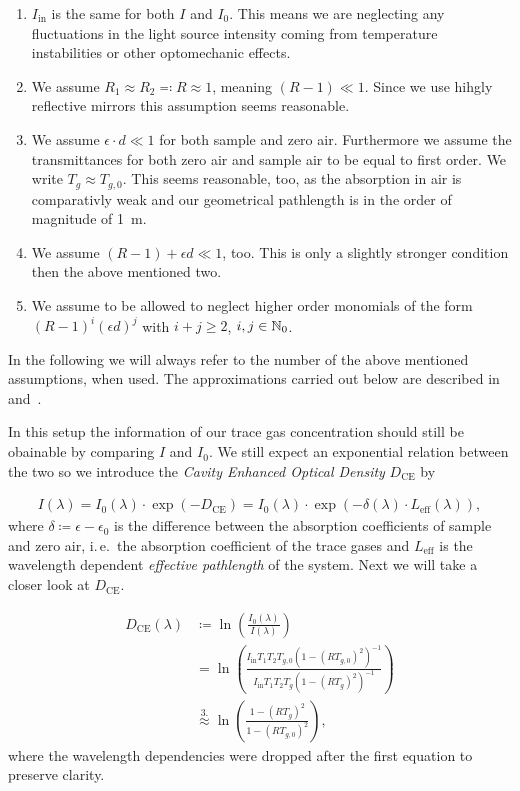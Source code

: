 \begin{enumerate}
\item $I_{\text{in}}$ is the same for both $I$ and $I_0$. This means
  we are neglecting any fluctuations in the light source intensity
  coming from temperature instabilities or other optomechanic effects.
\item We assume $R_1 \approx R_2 \eqqcolon R \approx 1$, meaning $(R -
  1) \ll 1$. Since we use hihgly reflective mirrors this assumption
  seems reasonable.
\item We assume $\epsilon \cdot d \ll 1$ for both sample and zero
  air. Furthermore we assume the transmittances for both zero air and
  sample air to be equal to first order. We write $T_g \approx
  T_{g,0}$. This seems reasonable, too, as the absorption in air is
  comparativly weak and our geometrical pathlength is in the order of
  magnitude of \SI{1}{\meter}.
\item We assume  $(R - 1) + \epsilon d \ll 1$, too. This is only a
  slightly stronger condition then the above mentioned two.
\item We assume to be allowed to neglect higher order monomials of the
  form $(R-1)^i(\epsilon d)^j$  with $i+j \geq 2$, $i,j \in \mathbb{N}_0$.
\end{enumerate}

In the following we will always refer to the number of the above
mentioned assumptions, when used. The approximations carried out below
are described in~\cite{platt2009} and~\cite{fiedler2003}.

In this setup the information of our trace gas concentration should
still be obainable by comparing $I$ and $I_0$. We still expect an
exponential relation between the two so we introduce the \emph{Cavity
  Enhanced Optical Density} $D_{\text{CE}}$ by

\begin{align}
  I(\lambda) = I_0(\lambda) \cdot \exp(- D_{\text{CE}}) = I_0(\lambda)
  \cdot \exp(-\delta(\lambda) \cdot L_{\text{eff}}(\lambda)),\label{eq:opt-dens}
\end{align}
where $\delta \coloneqq \epsilon - \epsilon_0$ is the difference
between the absorption coefficients of sample and zero air, i.\,e.\ the
absorption coefficient of the trace gases and $L_{\text{eff}}$ is the
wavelength dependent \emph{effective pathlength} of the system. Next
we will take a closer look at $D_{\text{CE}}$.

\begin{align}
  D_{\text{CE}}(\lambda) & \coloneqq \ln\left(
                           \frac{I_0(\lambda)}{I(\lambda)}\right)\nonumber\\
                         & = \ln\left ( \frac{I_{\text{in}}T_1T_2T_{g,0}(1 -
                           (RT_{g,0})^2)^{-1}}{I_{\text{in}}T_1T_2T_g(1 -
                           (RT_g)^2)^{-1}}\right)\nonumber\\
                         & \stackrel{3.}{\approx} \ln\left( \frac{1 -
                           (RT_g)^2}{1 - (RT_{g,0})^2}\right)\label{eq:d_ce},
\end{align}
where the wavelength dependencies were dropped after the first
equation to preserve clarity. 

